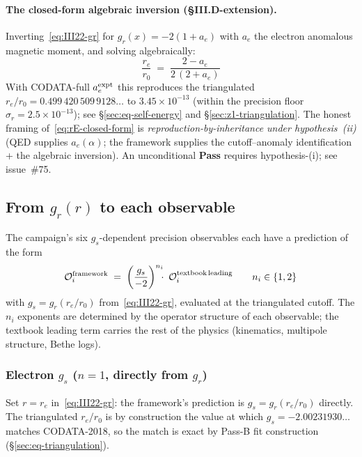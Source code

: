 \paragraph{The closed-form algebraic inversion (\S III.D-extension).}
Inverting~\eqref{eq:III22-gr} for $g_r(x) = -2(1 + a_e)$ with $a_e$ the
electron anomalous magnetic moment, and solving algebraically:
\begin{equation}
\label{eq:rE-closed-form}
\boxed{\;\frac{r_e}{r_0} \;=\; \frac{2 - a_e}{2\,(2 + a_e)}\;}
\end{equation}
With CODATA-full $a_e^{\rm expt}$ this reproduces the triangulated
$r_e/r_0 = 0.499\,420\,509\,9128\dots$ to $3.45\times 10^{-13}$ (within the
precision floor $\sigma_r = 2.5\times 10^{-13}$); see
\S\ref{sec:eq-self-energy} and \S\ref{sec:z1-triangulation}. The
honest framing of~\eqref{eq:rE-closed-form} is
\emph{reproduction-by-inheritance under hypothesis~(ii)} (QED supplies
$a_e(\alpha)$; the framework supplies the cutoff--anomaly identification +
the algebraic inversion). An unconditional \textbf{Pass} requires
hypothesis-(i); see issue~\#75.

\subsection{From $g_r(r)$ to each observable}
\label{sec:from-gr-to-observables}

The campaign's six $g_s$-dependent precision observables each have a
prediction of the form
\begin{equation}
\label{eq:gs-n-textbook}
\mathcal{O}_i^{\rm framework}
\;=\; \left(\frac{g_s}{-2}\right)^{n_i}\!\!\!\cdot\;\mathcal{O}_i^{\rm textbook\,leading}
\qquad n_i \in \{1, 2\}
\end{equation}
with $g_s = g_r(r_e/r_0)$ from~\eqref{eq:III22-gr}, evaluated at the
triangulated cutoff. The $n_i$ exponents are determined by the operator
structure of each observable; the textbook leading term carries the rest
of the physics (kinematics, multipole structure, Bethe logs).

\subsubsection{Electron $g_s$ ($n=1$, directly from $g_r$)}

Set $r = r_e$ in~\eqref{eq:III22-gr}: the framework's prediction is
$g_s = g_r(r_e/r_0)$ directly. The triangulated $r_e/r_0$ is by construction
the value at which $g_s = -2.00231930\dots$ matches CODATA-2018, so the
match is exact by Pass-B fit construction
(\S\ref{sec:eq-triangulation}).

